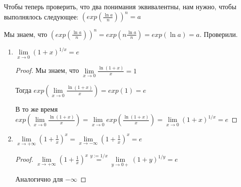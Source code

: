     Чтобы теперь проверить, что два понимания эквивалентны, нам нужно, чтобы выполнялось следующее: 
    $(exp(\frac{\ln{a}}{n}))^n = a$ 

    Мы знаем, что $(exp(\frac{\ln{a}}{n}))^n = exp(n \frac{\ln{a}}{n}) = exp(\ln{a}) = a$. Проверили.

\follow 
\begin{enumerate}
    \item $\lim\limits_{x \rightarrow 0}{(1+x)^{1/x}} = e$
    \begin{proof} \quad

        Мы знаем, что $\lim\limits_{x \rightarrow 0}{\frac{\ln{(1+x)}}{x}} = 1$

        Тогда $exp \left(\lim\limits_{x \rightarrow 0}{\frac{\ln{(1+x)}}{x}} \right) = exp(1) = e$

        В то же время $exp \left(\lim\limits_{x \rightarrow 0}{\frac{\ln{(1+x)}}{x}} \right) = \lim\limits_{x \rightarrow 0}{exp \left(\frac{\ln{(1+x)}}{x} \right)} = \lim\limits_{x \rightarrow 0}{(1+x)^{1/x}} = e$
    \end{proof}
    \item $\lim\limits_{x \rightarrow +\infty}{(1 + \frac{1}{x})^x} = \lim\limits_{x \rightarrow -\infty}{(1 + \frac{1}{x})^x} = e$
    \begin{proof} \quad 

        $\lim\limits_{x \rightarrow +\infty}{(1 + \frac{1}{x})^x} \overset{y := 1/x}{=} \lim\limits_{y \rightarrow 0+}{(1+y)^{1/y}} = e$ 
        
        Аналогично для $-\infty$
    \end{proof}
\end{enumerate}
